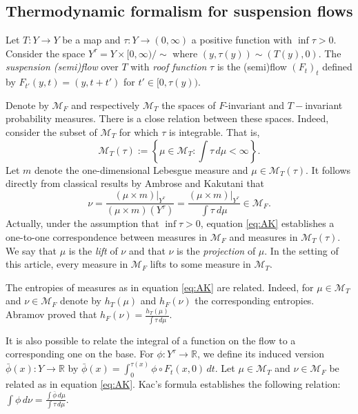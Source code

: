 \documentclass[12pt]{article}
\numberwithin{equation}{section}
\newcommand{\M}{\mathcal{M}}
\newcommand{\R}{\mathbb{R}}
\newcommand{\F}{F}
\begin{document}
\subsection{Thermodynamic formalism for suspension flows} \label{sec:tf}

 Let $T:Y\to Y$ be a map and $\tau:Y\to (0, \infty)$ a positive function with $\inf\tau>0$. Consider the space  $Y^\tau=Y\times [0, \infty)/\sim$ where $(y, \tau(y))\sim (T(y), 0)$. The \emph{suspension (semi)flow} over $T$ with \emph{roof function} $\tau$ is the (semi)flow $(\F_t)_t$ defined by $\F_{t'}(y, t) = (y, t+t')$ for $t'\in [0,\tau(y))$.

Denote by $\M_{\F}$ and respectively $\M_T$ the spaces of $F$-invariant  and $T-$invariant probability measures. There is a close relation between these spaces. Indeed, consider the subset of $\M_T$ for which $\tau$ is integrable. That is,
\begin{equation}
\M_T(\tau):= \left\{ \mu \in \mathcal{M}_{T}: \int \tau \,  d \mu < \infty \right\}.
\end{equation}
Let $m$ denote the one-dimensional Lebesgue measure and  $\mu \in \M_T(\tau)$. It follows directly from classical results 
by Ambrose and Kakutani \cite{AmbKak42} that 
\begin{equation}
\nu= \frac{(\mu \times m)|_{Y^\tau} }{(\mu \times m)(Y^\tau)} = \frac{(\mu \times m)|_{Y^\tau} }{\int\tau~d\mu} \in \M_{F}. \label{eq:AK}
\end{equation}
Actually, under the assumption that $\inf\tau>0$,  equation \eqref{eq:AK} establishes a one-to-one correspondence  between measures in $\M_F$ and measures in $\M_T(\tau)$.  We say that $\mu$ is the \emph{lift} of $\nu$ and that $\nu$ is the \emph{projection} of $\mu$.  In the setting of this article, every measure in $\M_F$ lifts to some measure in $\M_T$.


The entropies of measures  as in equation \eqref{eq:AK} are related. Indeed,  for $\mu\in \M_T$ and $\nu \in \M_F$  denote by  $h_T(\mu)$ and $h_F(\nu)$ the corresponding entropies. Abramov \cite{ab} proved that   $h_F(\nu) = \frac{h_T(\mu)}{\int\tau \, d\mu}$.

It is also possible to relate the integral of a function on the flow to a corresponding one on the base. For $\phi:Y^{\tau} \to \R$, we define its induced version  $\bar\phi(x):Y \to \R$ by   $\bar\phi(x) =  \int_0^{\tau(x)} \phi\circ \F_t(x, 0)\, dt$. Let $\mu\in \M_T$ and $\nu \in \M_F$  be related as in equation \eqref{eq:AK}. Kac's formula establishes the following relation:  $\int\phi \, d\nu= \frac{\int\bar\phi \, d\mu}{\int\tau \,d\mu}$.
\end{document}
